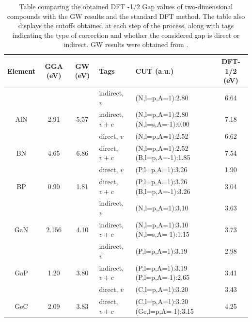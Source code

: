 \begin{table}[h]
    \small
    \setlength{\tabcolsep}{5pt} %
    \renewcommand{\arraystretch}{1.2} %
    \caption{Table comparing the obtained DFT -1/2 Gap values of two-dimensional compounds with the GW results and the standard DFT method. The table also displays the cutoffs obtained at each step of the process, along with tags indicating the type of correction and whether the considered gap is direct or indirect. GW results were obtained from \cite{PhysRevB.97.045426}.}
    \label{tab:2d_compounds_results}
  
    \begin{tabular}{c c c l p{3.5cm} c}
        \hline
        \hline
        \textbf{Element} & \textbf{GGA (eV)} & \textbf{GW (eV)} & \textbf{Tags} & \textbf{CUT (a.u.)} & \textbf{DFT-1/2 (eV)} \\
        \hline
        & & &  indirect, $v$  & (N,l=p,A=1):2.80 & 6.64  \\
        \multirow{-2}{*}{AlN} & \multirow{-2}{*}{2.91}  & \multirow{-2}{*}{5.57} & indirect, $v+c$   & (N,l=p,A=1):2.80 (N,l=s,A=-1):0.00 & 7.18\\
        

        & & & direct, $v$    & (N,l=p,A=1):2.52 & 6.62\\
        \multirow{-2}{*}{BN} & \multirow{-2}{*}{4.65}  & \multirow{-2}{*}{6.86} &direct, $v+c$  & (N,l=p,A=1):2.52 (B,l=p,A=-1):1.85 & 7.54 \\

        
        & & &direct, $v$  & (P,l=p,A=1):3.26 & 1.90  \\
        \multirow{-2}{*}{BP} & \multirow{-2}{*}{0.90} & \multirow{-2}{*}{1.81} & direct, $v+c$   & (P,l=p,A=1):3.26 (B,l=p,A=-1):3.26 & 3.04 \\


        & & & indirect, $v$  & (N,l=p,A=1):3.10 & 3.63 \\
        \multirow{-2}{*}{GaN} & \multirow{-2}{*}{2.156} & \multirow{-2}{*}{4.10} & indirect, $v+c$  & (N,l=p,A=1):3.10 (N,l=s,A=-1):1.15 &3.73  \\
        
        
        & & & indirect, $v$  &  (P,l=p,A=1):3.19 & 2.98   \\
        \multirow{-2}{*}{GaP} & \multirow{-2}{*}{1.20} & \multirow{-2}{*}{3.80} & indirect, $v+c$   &  (P,l=p,A=1):3.19  (P,l=p,A=-1):2.65& 3.41 \\

        
        & & & direct, $v$ & (C,l=p,A=1):3.20 & 3.43   \\
        \multirow{-2}{*}{GeC} & \multirow{-2}{*}{2.09} & \multirow{-2}{*}{3.83} & direct, $v+c$   & (C,l=p,A=1):3.20 (Ge,l=p,A=-1):3.15 & 4.25  \\
        

\end{tabular}
\end{table}

